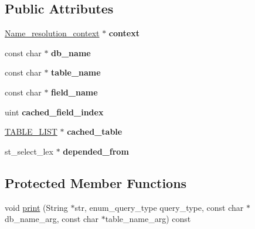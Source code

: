 \subsection*{Public Attributes}
\begin{DoxyCompactItemize}
\item 
\mbox{\label{classItem__ident_a7ce283486db51db26f5e933bdcf8cab1}} 
\mbox{\hyperlink{structName__resolution__context}{Name\+\_\+resolution\+\_\+context}} $\ast$ {\bfseries context}
\item 
\mbox{\label{classItem__ident_a905a4da964ec1fcf3e6d9e0f26b00a09}} 
const char $\ast$ {\bfseries db\+\_\+name}
\item 
\mbox{\label{classItem__ident_a7958cfc400350589916c2e9e704c3608}} 
const char $\ast$ {\bfseries table\+\_\+name}
\item 
\mbox{\label{classItem__ident_aaeb85ca43a89537e679b1a0d3345ec16}} 
const char $\ast$ {\bfseries field\+\_\+name}
\item 
\mbox{\label{classItem__ident_a9d553ff52b463f89ecccaa105005051a}} 
uint {\bfseries cached\+\_\+field\+\_\+index}
\item 
\mbox{\label{classItem__ident_a223629a9ccffd1183c7ad278b9d3383a}} 
\mbox{\hyperlink{structTABLE__LIST}{T\+A\+B\+L\+E\+\_\+\+L\+I\+ST}} $\ast$ {\bfseries cached\+\_\+table}
\item 
\mbox{\label{classItem__ident_a976d3213b92d110c3735bde1f3685a8e}} 
st\+\_\+select\+\_\+lex $\ast$ {\bfseries depended\+\_\+from}
\end{DoxyCompactItemize}
\subsection*{Protected Member Functions}
\begin{DoxyCompactItemize}
\item 
void \mbox{\hyperlink{classItem__ident_a4ab5d9635a58d5ab39aefc45bb70a09d}{print}} (String $\ast$str, enum\+\_\+query\+\_\+type query\+\_\+type, const char $\ast$db\+\_\+name\+\_\+arg, const char $\ast$table\+\_\+name\+\_\+arg) const
\end{DoxyCompactItemize}

